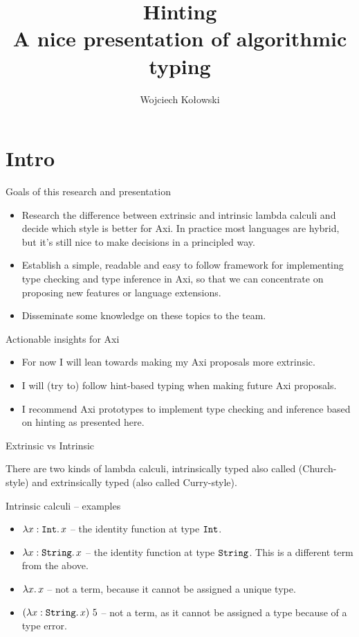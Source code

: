 \documentclass{beamer}
\title{Hinting\\A nice presentation of algorithmic typing}
\author{Wojciech Kołowski}
\date{}
\begin{document}
\frame{\titlepage}

\section{Intro}

\begin{frame}{Goals of this research and presentation}

\begin{itemize}
  \item Research the difference between extrinsic and intrinsic lambda calculi and decide which style is better for Axi. In practice most languages are hybrid, but it's still nice to make decisions in a principled way.
  \item Establish a simple, readable and easy to follow framework for implementing type checking and type inference in Axi, so that we can concentrate on proposing new features or language extensions.
  \item Disseminate some knowledge on these topics to the team.
\end{itemize}

\end{frame}

\begin{frame}{Actionable insights for Axi}

\begin{itemize}
  \item For now I will lean towards making my Axi proposals more extrinsic.
  \item I will (try to) follow hint-based typing when making future Axi proposals.
  \item I recommend Axi prototypes to implement type checking and inference based on hinting as presented here.
\end{itemize}

\end{frame}

\begin{frame}{Extrinsic vs Intrinsic}

There are two kinds of lambda calculi, intrinsically typed also called (Church-style) and extrinsically typed (also called Curry-style).

\end{frame}

\begin{frame}{Intrinsic calculi -- examples}

\begin{itemize}
  \item $\fun{x}[\Int]{x}$ -- the identity function at type $\texttt{Int}$.
  \item $\fun{x}[\String]{x}$ -- the identity function at type $\texttt{String}$. This is a different term from the above.
  \item $\fun{x}{x}$ -- not a term, because it cannot be assigned a unique type.
  \item $\app{(\fun{x}[\String]{x})}{5}$ -- not a term, as it cannot be assigned a type because of a type error.
\end{itemize}

\end{frame}
\end{document}
